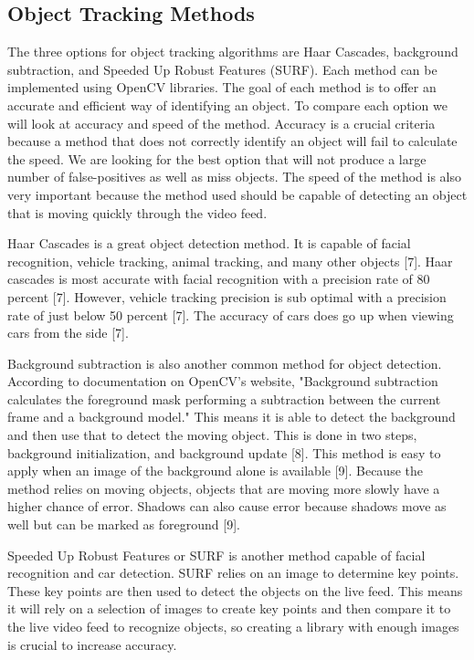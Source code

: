 \documentclass[letterpaper,10pt,onecolumn,draftclsnofoot]{IEEEtran}
\begin{document}
\newpage
\subsection{Object Tracking Methods} %

The three options for object tracking algorithms are Haar Cascades, background subtraction, and Speeded Up Robust Features (SURF).
Each method can be implemented using OpenCV libraries.
The goal of each method is to offer an accurate and efficient way of identifying an object.
To compare each option we will look at accuracy and speed of the method.
Accuracy is a crucial criteria because a method that does not correctly identify an object will fail to calculate the speed.
We are looking for the best option that will not produce a large number of false-positives as well as miss objects.
The speed of the method is also very important because the method used should be capable of detecting an object that is moving quickly through the video feed.


Haar Cascades is a great object detection method.
It is capable of facial recognition, vehicle tracking, animal tracking, and many other objects [7].
Haar cascades is most accurate with facial recognition with a precision rate of 80 percent [7].
However, vehicle tracking precision is sub optimal with a precision rate of just below 50 percent [7].
The accuracy of cars does go up when viewing cars from the side [7].

Background subtraction is also another common method for object detection.
According to documentation on OpenCV's website, "Background subtraction calculates the foreground mask performing a subtraction between the current frame and a background model."
This means it is able to detect the background and then use that to detect the moving object.
This is done in two steps, background initialization, and background update [8].
This method is easy to apply when an image of the background alone is available [9].
Because the method relies on moving objects, objects that are moving more slowly have a higher chance of error.
Shadows can also cause error because shadows move as well but can be marked as foreground [9].

Speeded Up Robust Features or SURF is another method capable of facial recognition and car detection.
SURF relies on an image to determine key points.
These key points are then used to detect the objects on the live feed.
This means it will rely on a selection of images to create key points and then compare it to the live video feed to recognize objects, so creating a library with enough images is crucial to increase accuracy.
\end{document}
